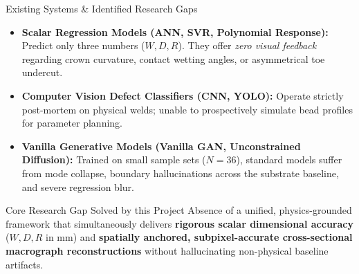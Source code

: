 \documentclass[aspectratio=169]{beamer}
\begin{document}
\begin{frame}{Existing Systems \& Identified Research Gaps}
	\begin{itemize}
		\item \textbf{Scalar Regression Models (ANN, SVR, Polynomial Response):}
		Predict only three numbers ($W, D, R$). They offer \textit{zero visual feedback} regarding crown curvature, contact wetting angles, or asymmetrical toe undercut.
		\item \textbf{Computer Vision Defect Classifiers (CNN, YOLO):}
		Operate strictly post-mortem on physical welds; unable to prospectively simulate bead profiles for parameter planning.
		\item \textbf{Vanilla Generative Models (Vanilla GAN, Unconstrained Diffusion):}
		Trained on small sample sets ($N=36$), standard models suffer from mode collapse, boundary hallucinations across the substrate baseline, and severe regression blur.
	\end{itemize}

	\vspace{0.3cm}
	\begin{alertblock}{Core Research Gap Solved by this Project}
		Absence of a unified, physics-grounded framework that simultaneously delivers \textbf{rigorous scalar dimensional accuracy} ($W, D, R$ in mm) and \textbf{spatially anchored, subpixel-accurate cross-sectional macrograph reconstructions} without hallucinating non-physical baseline artifacts.
	\end{alertblock}
\end{frame}
\end{document}
